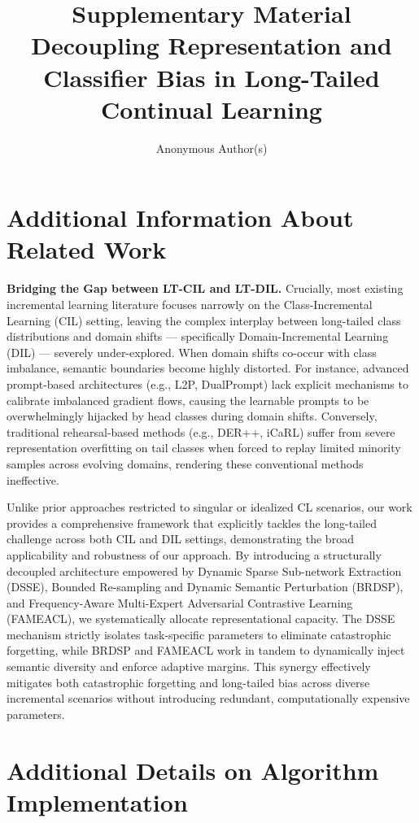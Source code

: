 \documentclass[journal]{IEEEtran}
\title{Supplementary Material\\Decoupling Representation and Classifier Bias in Long-Tailed Continual Learning}
\author{Anonymous Author(s)}
\theoremstyle{plain}
\theoremstyle{definition}
\theoremstyle{remark}
\begin{document}
\maketitle
\appendices

\section{Additional Information About Related Work}\label{app:related_work}


\noindent\textbf{Bridging the Gap between LT-CIL and LT-DIL.}
Crucially, most existing incremental learning literature focuses narrowly on the Class-Incremental Learning (CIL) setting, leaving the complex interplay between long-tailed class distributions and domain shifts — specifically Domain-Incremental Learning (DIL) — severely under-explored. When domain shifts co-occur with class imbalance, semantic boundaries become highly distorted. For instance, advanced prompt-based architectures (e.g., L2P, DualPrompt) lack explicit mechanisms to calibrate imbalanced gradient flows, causing the learnable prompts to be overwhelmingly hijacked by head classes during domain shifts. Conversely, traditional rehearsal-based methods (e.g., DER++, iCaRL) suffer from severe representation overfitting on tail classes when forced to replay limited minority samples across evolving domains, rendering these conventional methods ineffective.

Unlike prior approaches restricted to singular or idealized CL scenarios, our work provides a comprehensive framework that explicitly tackles the long-tailed challenge across both CIL and DIL settings, demonstrating the broad applicability and robustness of our approach. By introducing a structurally decoupled architecture empowered by Dynamic Sparse Sub-network Extraction (DSSE), Bounded Re-sampling and Dynamic Semantic Perturbation (BRDSP), and Frequency-Aware Multi-Expert Adversarial Contrastive Learning (FAMEACL), we systematically allocate representational capacity. The DSSE mechanism strictly isolates task-specific parameters to eliminate catastrophic forgetting, while BRDSP and FAMEACL work in tandem to dynamically inject semantic diversity and enforce adaptive margins. This synergy effectively mitigates both catastrophic forgetting and long-tailed bias across diverse incremental scenarios without introducing redundant, computationally expensive parameters.

\section{Additional Details on Algorithm Implementation}\label{app:algorithm_details}
\end{document}
